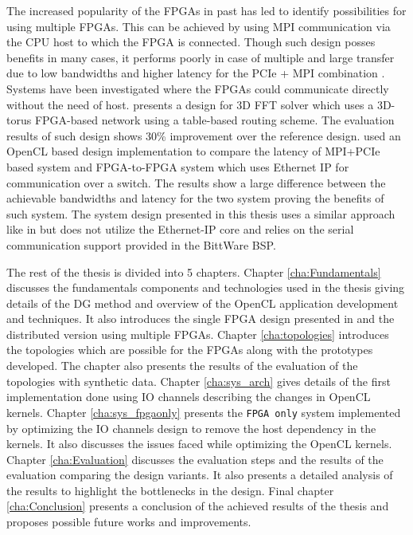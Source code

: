 The increased popularity of the FPGAs in past has led to identify possibilities for
using multiple FPGAs. This can be achieved by using \ac{MPI} communication via the CPU host
to which the FPGA is connected. Though such design posses benefits in many cases,
it performs poorly in case of multiple and large transfer due to low bandwidths
and higher latency for the PCIe + \ac{MPI} combination \cite{kobayashi_opencl-ready_2018}.
Systems have been investigated where the FPGAs could
communicate directly without the need of host. \textcite{sheng_hpc_2017} presents a design
for 3D FFT solver which uses a 3D-torus FPGA-based network using a table-based routing
scheme. The evaluation results of such design shows 30\% improvement over the reference design.
\textcite{kobayashi_opencl-ready_2018} used an OpenCL based design implementation to
compare the latency of \ac{MPI}+PCIe based system and FPGA-to-FPGA system which uses Ethernet
IP for communication over a switch. The results show a large difference between the achievable
bandwidths and latency for the two system proving the benefits of such system. The system
design presented in this thesis uses a similar approach like in \cite{kobayashi_opencl-ready_2018}
but does not utilize the Ethernet-IP core and relies on the serial communication
support provided in the BittWare BSP.

The rest of the thesis is divided into 5 chapters. Chapter \ref{cha:Fundamentals} discusses
the fundamentals components and technologies used in the thesis giving details of the DG method
and overview of the OpenCL application development and techniques. It also introduces
the single FPGA design presented in \cite{kenter_opencl-based_2018} and the distributed
version using multiple FPGAs. Chapter \ref{cha:topologies} introduces the topologies which
are possible for the FPGAs along with the prototypes developed. The chapter also presents
the results of the evaluation of the topologies with synthetic data. Chapter \ref{cha:sys_arch}
gives details of the first implementation done using IO channels describing
the changes in OpenCL kernels. Chapter \ref{cha:sys_fpgaonly}
presents the \texttt{FPGA only} system implemented by optimizing the IO channels design
to remove the host dependency in the kernels. It also discusses the issues faced while
optimizing the OpenCL kernels. Chapter \ref{cha:Evaluation} discusses the evaluation steps
and the results of the evaluation comparing the design variants. It also presents a detailed
analysis of the results to highlight the bottlenecks in the design.
Final chapter \ref{cha:Conclusion} presents a conclusion of the achieved results of the thesis
and proposes possible future works and improvements.